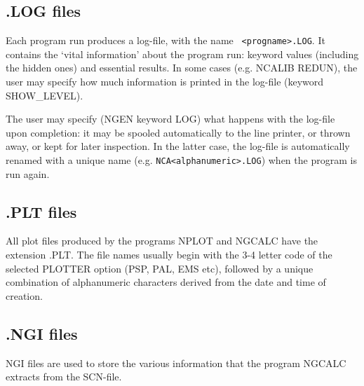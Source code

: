 \subsection{.LOG files} 
\label{log} 

	Each \NEWSTAR program run produces a log-file, with the name {\tt
<progname>.LOG}.  It contains the `vital information' about the program run:
keyword values (including the hidden ones) and essential results.  In some
cases (e.g.  NCALIB REDUN), the user may specify how much information is
printed in the log-file (keyword SHOW\_LEVEL). 

	The user may specify (NGEN keyword LOG) what happens with the log-file
upon completion: it may be spooled automatically to the line printer, or thrown
away, or kept for later inspection.  In the latter case, the log-file is
automatically renamed with a unique name (e.g. {\tt NCA<alphanumeric>.LOG})
when the program is run again. 

\subsection{.PLT files} 
\label{plt} 

	All plot files produced by the programs NPLOT and NGCALC have the
extension .PLT.  The file names usually begin with the 3-4 letter code of the
selected PLOTTER option (PSP, PAL, EMS etc), followed by a unique combination
of alphanumeric characters derived from the date and time of creation. 

\subsection{.NGI files} 
\label{ngi} 

	NGI files are used to store the various information that the program
NGCALC extracts from the SCN-file. 

